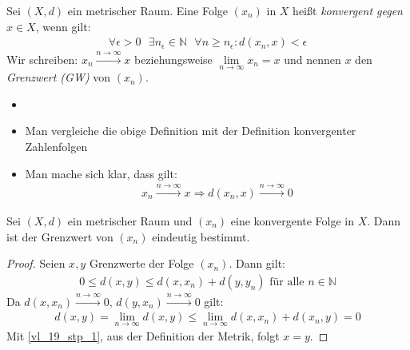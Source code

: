 \begin{Definition}{%
	Sei $(X,d)$ ein metrischer Raum. Eine Folge $(x_n)$ in $X$ heißt 
	\emph{konvergent gegen} $x \in X$, wenn gilt:
	\begin{align*}
		\forall \epsilon > 0 \text{ } \exists n_\epsilon \in \mathbb{N} \text{ }
		\forall n \geq n_\epsilon : d(x_n, x) < \epsilon
	\end{align*}
	Wir schreiben: $x_n \overset{n\rightarrow \infty}{\longrightarrow} x$ 
	beziehungsweise $\lim\limits_{n \rightarrow \infty}{x_n} = x$ und nennen 
	$x$ den \emph{Grenzwert (GW)} von $(x_n)$. 
}\end{Definition}

\begin{Bemerkung}{
	\begin{itemize}
		\item[ ]
		\item Man vergleiche die obige Definition mit der Definition konvergenter 
		 Zahlenfolgen
		 \item Man mache sich klar, dass gilt:
		 \begin{align*}
		 	x_n \xrightarrow{n \rightarrow \infty} x \Longrightarrow 
		 	d(x_n, x) \xrightarrow{n \rightarrow \infty} 0
		 \end{align*}
	\end{itemize}
}\end{Bemerkung}

\begin{Lemma}{%
	Sei $(X,d)$ ein metrischer Raum und $(x_n)$ eine konvergente Folge in $X$. 
	Dann ist der Grenzwert von $(x_n)$ eindeutig bestimmt.
}\end{Lemma}

\begin{proof}
	Seien $x,y$ Grenzwerte der Folge $(x_n)$. Dann gilt:
	\begin{align*}
		0 \leq d (x,y) \leq d(x,x_n) + d(y, y_n) \text{ für alle } n \in \mathbb{N}
	\end{align*}
	Da $d(x,x_n) \overset{n \rightarrow \infty}{\longrightarrow} 0$, 
	$d(y, x_n) \overset{n \rightarrow \infty}{\longrightarrow} 0$ gilt:
	\begin{align*}
		d(x,y) = \lim\limits_{n \rightarrow \infty} d(x,y) \leq 
		\lim\limits_{n \rightarrow \infty} d(x,x_n) + d(x_n,y) = 0
	\end{align*}
	Mit \ref{vl_19_stp_1}, aus der Definition der Metrik, folgt $x = y$.
\end{proof}

